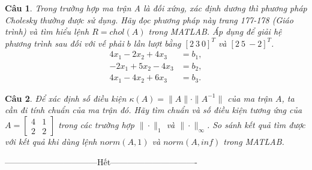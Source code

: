 \documentclass[11pt]{article}
\newtheorem{bt}{Câu}
\newcommand{\m}[1]{\begin{bmatrix}
		#1
\end{bmatrix}}
\begin{document}
\begin{bt}
	Trong trường hợp ma trận A là đối xứng, xác định dương thì phương pháp Cholesky thường được sử dụng. Hãy đọc phương pháp này trang 177-178 (Giáo trình) và tìm hiểu lệnh $R = chol(A)$ trong MATLAB. Áp dụng để giải hệ phương trình sau đối với vế phải $b$ lần lượt bằng $[2 \ 3 \ 0]^T$ và $[2 \ 5 \ -2]^T$.
	\begin{align*}
	4 x_1 - 2 x_2 + 4 x_3   &= b_1, \\
	-2 x_1 + 5 x_2 - 4 x_3  &= b_2, \\
	4 x_1  -4 x_2 + 6 x_3   &= b_3. 
	\end{align*}
\end{bt}

\begin{bt} 
Để xác định số điều kiện $\kappa(A) = \|A\| \cdot \|A^{-1}\|$ của ma trận $A$, ta cần đi tính chuẩn của ma trận đó. Hãy tìm chuẩn và số điều kiện tương ứng của $A=\m{4 & 1 \\ 2 & 2}$ trong các trường hợp  $\|\cdot\|_{1}$ và $\|\cdot\|_{\infty}$. So sánh kết quả tìm được với kết quả khi dùng lệnh $norm(A,1)$ và $norm(A,inf)$ trong MATLAB.
\end{bt}

\centerline{———————————Hết——————————-}
\end{document}
